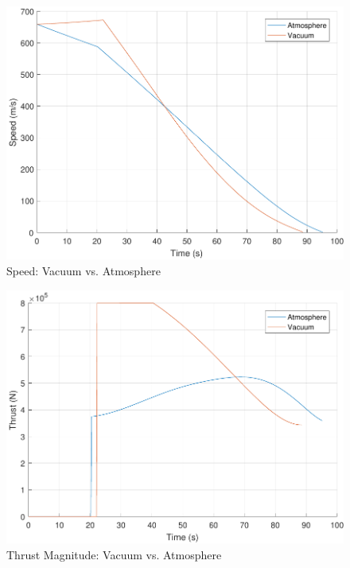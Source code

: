 \begin{figure}[H]
	\centering
	\begin{minipage}{4.3 in}
		\includegraphics[width=\linewidth]{Figures/spdatmovsvac.pdf}
		\caption{Speed: Vacuum vs. Atmosphere \label{fig:spdatmovsvac} }
	\end{minipage}
\end{figure}

\begin{figure}[H]
	\centering
	\begin{minipage}{4.3 in}
		\includegraphics[width=\linewidth]{Figures/thratmovsvac.pdf}
		\caption{Thrust Magnitude: Vacuum vs. Atmosphere \label{fig:thratmovsvac} }
	\end{minipage}
\end{figure}

